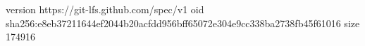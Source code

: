 version https://git-lfs.github.com/spec/v1
oid sha256:e8eb37211644ef2044b20acfdd956bff65072e304e9cc338ba2738fb45f61016
size 174916
